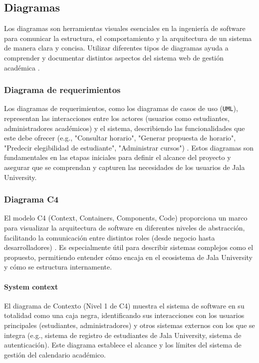 \subsection{Diagramas}
Los diagramas son herramientas visuales esenciales en la ingeniería de software para comunicar la estructura, el comportamiento y la arquitectura de un sistema de manera clara y concisa. Utilizar diferentes tipos de diagramas ayuda a comprender y documentar distintos aspectos del sistema web de gestión académica \parencite{Fowler2003}.

\subsubsection{Diagrama de requerimientos}
Los diagramas de requerimientos, como los diagramas de casos de uso (\texttt{UML}), representan las interacciones entre los actores (usuarios como estudiantes, administradores académicos) y el sistema, describiendo las funcionalidades que este debe ofrecer (e.g., "Consultar horario", "Generar propuesta de horario", "Predecir elegibilidad de estudiante", "Administrar cursos") \parencite{Jacobson1992}. Estos diagramas son fundamentales en las etapas iniciales para definir el alcance del proyecto y asegurar que se comprendan y capturen las necesidades de los usuarios de Jala University.

\subsubsection{Diagrama C4}
El modelo C4 (Context, Containers, Components, Code) proporciona un marco para visualizar la arquitectura de software en diferentes niveles de abstracción, facilitando la comunicación entre distintos roles (desde negocio hasta desarrolladores) \parencite{BrownC4}. Es especialmente útil para describir sistemas complejos como el propuesto, permitiendo entender cómo encaja en el ecosistema de Jala University y cómo se estructura internamente.

\paragraph{System context}
El diagrama de Contexto (Nivel 1 de C4) muestra el sistema de software en su totalidad como una caja negra, identificando sus interacciones con los usuarios principales (estudiantes, administradores) y otros sistemas externos con los que se integra (e.g., sistema de registro de estudiantes de Jala University, sistema de autenticación). Este diagrama establece el alcance y los límites del sistema de gestión del calendario académico.

